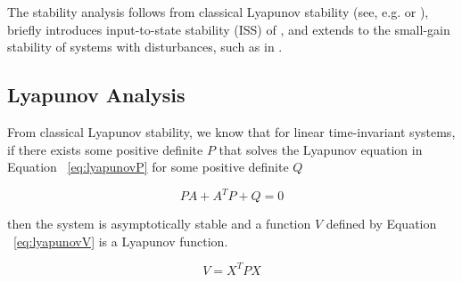 \documentclass[conference]{IEEEtran}
\begin{document}
The stability analysis follows from classical Lyapunov stability (see, e.g. \cite{Chen1999} or \cite{Khalil2002}), briefly introduces input-to-state stability (ISS) of \cite{TOCITE}, and extends to the small-gain stability of systems with disturbances, such as in \cite{LiberzonQuantDelay2006}.

\subsection{Lyapunov Analysis}

From classical Lyapunov stability, we know that for linear time-invariant systems, if there exists some positive definite $P$ that solves the Lyapunov equation in Equation ~\ref{eq:lyapunovP} for some positive definite $Q$

\begin{equation}
PA+A^TP+Q=0
\label{eq:lyapunovP}
\end{equation}

then the system is asymptotically stable and a function $V$ defined by Equation ~\ref{eq:lyapunovV} is a Lyapunov function.

\begin{equation}
V=X^TPX
\label{eq:lyapunovV}
\end{equation}
\end{document}
